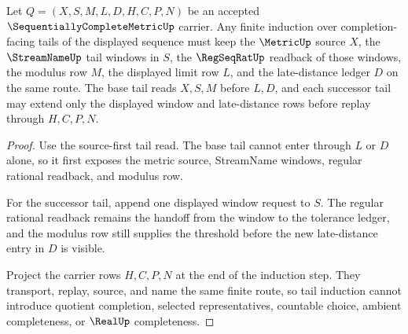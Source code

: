 \begin{theorem}
\label{thm:sequentially-complete-metric-tail-induction}
Let $Q=(X,S,M,L,D,H,C,P,N)$ be an accepted $\SequentiallyCompleteMetricUp$ carrier. Any finite induction over completion-facing tails of the displayed sequence must keep the $\MetricUp$ source $X$, the $\StreamNameUp$ tail windows in $S$, the $\RegSeqRatUp$ readback of those windows, the modulus row $M$, the displayed limit row $L$, and the late-distance ledger $D$ on the same route. The base tail reads $X,S,M$ before $L,D$, and each successor tail may extend only the displayed window and late-distance rows before replay through $H,C,P,N$.
\end{theorem}
\begin{proof}
Use the source-first tail read. The base tail cannot enter through $L$ or $D$ alone, so it first exposes the metric source, StreamName windows, regular rational readback, and modulus row.

For the successor tail, append one displayed window request to $S$. The regular rational readback remains the handoff from the window to the tolerance ledger, and the modulus row still supplies the threshold before the new late-distance entry in $D$ is visible.

Project the carrier rows $H,C,P,N$ at the end of the induction step. They transport, replay, source, and name the same finite route, so tail induction cannot introduce quotient completion, selected representatives, countable choice, ambient completeness, or $\RealUp$ completeness.
\end{proof}

